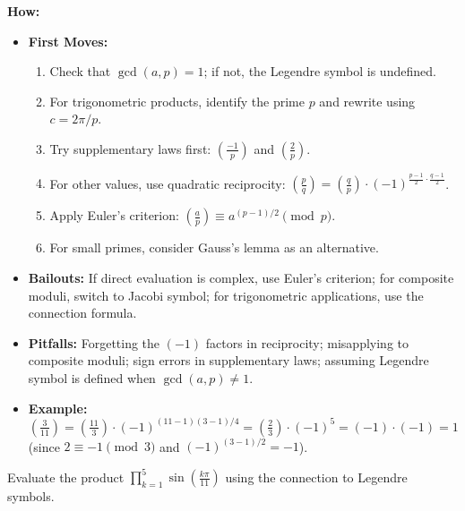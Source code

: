 \documentclass[12pt]{article}
\newenvironment{problem}[1]
{\begin{tcolorbox}[colback=blue!5!white,colframe=blue!75!black,title={#1}]}{\end{tcolorbox}}
\begin{document}
\textbf{How:}
\begin{itemize}
    \item \textbf{First Moves:}
    \begin{enumerate}[nosep]
        \item Check that $\gcd(a,p) = 1$; if not, the Legendre symbol is undefined.
        \item For trigonometric products, identify the prime $p$ and rewrite using $c = 2\pi/p$.
        \item Try supplementary laws first: $\left(\frac{-1}{p}\right)$ and $\left(\frac{2}{p}\right)$.
        \item For other values, use quadratic reciprocity: $\left(\frac{p}{q}\right) = \left(\frac{q}{p}\right) \cdot (-1)^{\frac{p-1}{2} \cdot \frac{q-1}{2}}$.
        \item Apply Euler's criterion: $\left(\frac{a}{p}\right) \equiv a^{(p-1)/2} \pmod{p}$.
        \item For small primes, consider Gauss's lemma as an alternative.
    \end{enumerate}
    \item \textbf{Bailouts:} If direct evaluation is complex, use Euler's criterion; for composite moduli, switch to Jacobi symbol; for trigonometric applications, use the connection formula.
    \item \textbf{Pitfalls:} Forgetting the $(-1)$ factors in reciprocity; misapplying to composite moduli; sign errors in supplementary laws; assuming Legendre symbol is defined when $\gcd(a,p) \neq 1$.
    \item \textbf{Example:} $\left(\frac{3}{11}\right) = \left(\frac{11}{3}\right) \cdot (-1)^{(11-1)(3-1)/4} = \left(\frac{2}{3}\right) \cdot (-1)^{5} = (-1) \cdot (-1) = 1$ (since $2 \equiv -1 \pmod{3}$ and $(-1)^{(3-1)/2} = -1$).
\end{itemize}

\begin{problem}{Example: Trigonometric Product via Legendre Symbol}
Evaluate the product $\prod_{k=1}^{5} \sin\left(\frac{k\pi}{11}\right)$ using the connection to Legendre symbols.
\end{problem}
\end{document}
